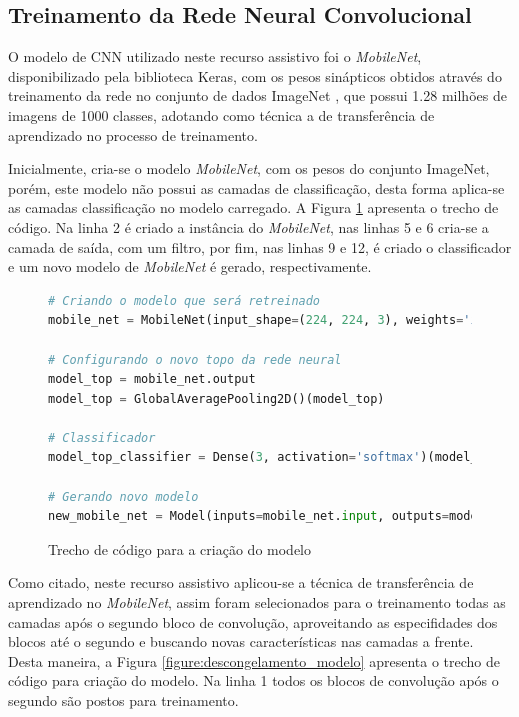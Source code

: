 
\subsection{Treinamento da Rede Neural Convolucional}

\par O modelo de CNN utilizado neste recurso assistivo foi o \textit{MobileNet}, disponibilizado pela biblioteca Keras, com os pesos sinápticos obtidos através do treinamento da rede no conjunto de dados ImageNet \cite{Russakovsky2015}, que possui 1.28 milhões de imagens de 1000 classes, adotando como técnica a de transferência de aprendizado no processo de treinamento. 

\par Inicialmente, cria-se o modelo \textit{MobileNet}, com os pesos do conjunto ImageNet, porém, este modelo não possui as camadas de classificação, desta forma aplica-se as camadas classificação no modelo carregado. A Figura \ref{figure:criacao_do_modelo} apresenta o trecho de código. Na linha 2 é criado a instância do \textit{MobileNet}, nas linhas 5 e 6 cria-se a camada de saída, com um filtro, por fim, nas linhas 9 e 12, é criado o classificador e um novo modelo de \textit{MobileNet} é gerado, respectivamente.

\begin{figure}[H]
    \centering
    \caption{Trecho de código para a criação do modelo}
    \begin{lstlisting}[language=Python]
# Criando o modelo que será retreinado
mobile_net = MobileNet(input_shape=(224, 224, 3), weights='imagenet', include_top=False)

# Configurando o novo topo da rede neural
model_top = mobile_net.output
model_top = GlobalAveragePooling2D()(model_top)

# Classificador
model_top_classifier = Dense(3, activation='softmax')(model_top)

# Gerando novo modelo
new_mobile_net = Model(inputs=mobile_net.input, outputs=model_top_classifier)
    \end{lstlisting}
    \label{figure:criacao_do_modelo}
\end{figure}

\par Como citado, neste recurso assistivo aplicou-se a técnica de transferência de aprendizado no \textit{MobileNet}, assim foram selecionados para o treinamento todas as camadas após o segundo bloco de convolução, aproveitando as especifidades dos blocos até o segundo e buscando novas características nas camadas a frente. Desta maneira, a Figura \ref{figure:descongelamento_modelo} apresenta o trecho de código para criação do modelo. Na linha 1 todos os blocos de convolução após o segundo são postos para treinamento.


